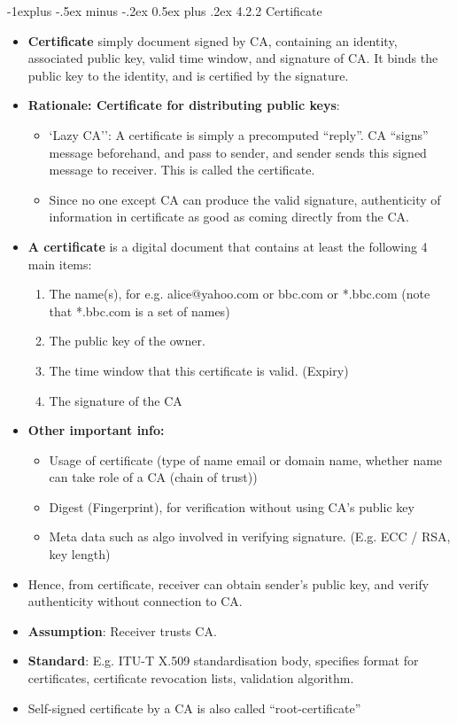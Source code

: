 \documentclass[10pt, landscape]{article}
\makeatletter
\renewcommand{\subsection}{\@startsection{subsection}{2}{0mm}%
                                {-1explus -.5ex minus -.2ex}%
                                {0.5ex plus .2ex}%
                                {\normalfont\normalsize\bfseries}}
\makeatother
\begin{document}
\begin{multicols*}{3}
\subsection{4.2.2 Certificate }
\begin{itemize}
\item \textbf{Certificate} simply document signed by CA, containing an identity, associated public key, valid time window, and signature of CA. It binds the public key to the identity, and is certified by the signature.
\item \textbf{Rationale: Certificate for distributing public keys}:
\begin{itemize}
\item `Lazy CA'': A certificate is simply a precomputed ``reply''. CA ``signs'' message beforehand, and pass to sender, and sender sends this signed message to receiver. This is called the certificate.
\item Since no one except CA can produce the valid signature, authenticity of information in certificate as good as coming directly from the CA.
\end{itemize}
\item \textbf{A certificate} is a digital document that contains at least the following 4 main items:
	\begin{enumerate}
	\item The name(s), for e.g. alice@yahoo.com or bbc.com or *.bbc.com (note that *.bbc.com is a set of names)
	\item The public key of the owner.
	\item The time window that this certificate is valid. (Expiry)
	\item The signature of the CA
	\end{enumerate}
\item \textbf{Other important info:} 
	\begin{itemize}
	\item Usage of certificate (type of name email or domain name, whether name can take role of a CA (chain of trust))
	\item Digest (Fingerprint), for verification without using CA's public key
	\item Meta data such as algo involved in verifying signature. (E.g. ECC / RSA, key length)
	\end{itemize}
\item Hence, from certificate, receiver can obtain sender's public key, and verify authenticity without connection to CA. 
\item \textbf{Assumption}: Receiver trusts CA.
\item \textbf{Standard}: E.g. ITU-T X.509 standardisation body, specifies format for certificates, certificate revocation lists, validation algorithm.
\item Self-signed certificate by a CA is also called “root-certificate”
\end{itemize}


\end{multicols*}
\end{document}
